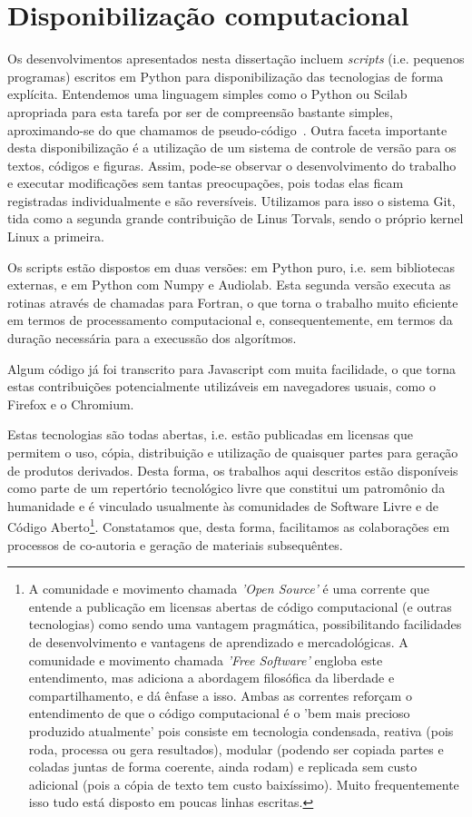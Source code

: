     \section{Disponibilização computacional}
Os desenvolvimentos apresentados nesta dissertação incluem \emph{scripts} (i.e. pequenos programas) escritos em Python para disponibilização das tecnologias de forma explícita. Entendemos uma linguagem simples como o Python ou Scilab apropriada para esta tarefa
por ser de compreensão bastante simples, aproximando-se do que chamamos de pseudo-código~\cite{tutPython}. Outra faceta importante desta disponibilização é a utilização de um sistema de controle de versão para os textos, códigos e figuras. Assim, pode-se observar o desenvolvimento do trabalho e executar modificações sem tantas preocupações, pois todas elas ficam registradas individualmente e são reversíveis. Utilizamos para isso o sistema Git, tida como a segunda grande contribuição de Linus Torvals, sendo o próprio kernel Linux a primeira.

Os scripts estão dispostos em duas versões: em Python puro, i.e. sem bibliotecas externas, e em Python com Numpy e Audiolab. Esta segunda versão executa as rotinas através de chamadas para Fortran, o que torna o trabalho muito eficiente em termos de processamento computacional e, consequentemente, em termos da duração necessária para a execussão dos algorítmos.

Algum código já foi transcrito para Javascript com muita facilidade, o que torna estas contribuições potencialmente utilizáveis em navegadores usuais, como o Firefox e o Chromium.

Estas tecnologias são todas abertas, i.e. estão publicadas em licensas que permitem o uso, cópia, distribuição e utilização de quaisquer partes para geração de produtos derivados. Desta forma, os trabalhos aqui descritos estão disponíveis como parte de um repertório tecnológico livre que constitui um patromônio da humanidade e é vinculado usualmente às comunidades de Software Livre e de Código Aberto\footnote{A comunidade e movimento chamada \emph{'Open Source'} é uma corrente que entende a publicação em licensas abertas de código computacional (e outras tecnologias) como sendo uma vantagem pragmática, possibilitando facilidades de desenvolvimento e vantagens de aprendizado e mercadológicas. A comunidade e movimento chamada \emph{'Free Software'} engloba este entendimento, mas adiciona a abordagem filosófica da liberdade e compartilhamento, e dá ênfase a isso. Ambas as correntes reforçam o entendimento de que o código computacional é o 'bem mais  precioso produzido atualmente' pois consiste em tecnologia condensada, reativa (pois roda, processa ou gera resultados), modular (podendo ser copiada partes e coladas juntas de forma coerente, ainda rodam) e replicada sem custo adicional (pois a cópia de texto tem custo baixíssimo). Muito frequentemente isso tudo está disposto em poucas linhas escritas.}. Constatamos que, desta forma, facilitamos as colaborações em processos de co-autoria e geração de materiais subsequêntes.

